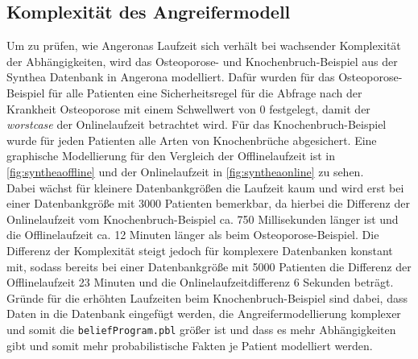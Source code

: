 \documentclass[german,version-2020-11]{uzl-thesis}
\begin{document}
\subsection{Komplexität des Angreifermodell}
Um zu prüfen, wie Angeronas Laufzeit sich verhält bei wachsender Komplexität der Abhängigkeiten, wird das Osteoporose- und Knochenbruch-Beispiel aus der Synthea Datenbank in Angerona modelliert. Dafür wurden für das Osteoporose-Beispiel für alle Patienten eine Sicherheitsregel für die Abfrage nach der Krankheit Osteoporose mit einem Schwellwert von 0 festgelegt, damit der \emph{worstcase} der Onlinelaufzeit betrachtet wird. Für das Knochenbruch-Beispiel wurde für jeden Patienten alle Arten von Knochenbrüche abgesichert. Eine graphische Modellierung für den Vergleich der Offlinelaufzeit ist in \autoref{fig:syntheaoffline} und der Onlinelaufzeit in \autoref{fig:syntheaonline} zu sehen.\\  Dabei wächst für kleinere Datenbankgrößen die Laufzeit kaum und wird erst bei einer Datenbankgröße mit 3000 Patienten bemerkbar, da hierbei die Differenz der Onlinelaufzeit vom Knochenbruch-Beispiel ca. 750 Millisekunden länger ist und die Offlinelaufzeit ca. 12 Minuten länger als beim Osteoporose-Beispiel. Die Differenz der Komplexität steigt jedoch für komplexere Datenbanken konstant mit, sodass bereits bei einer Datenbankgröße mit 5000 Patienten die Differenz der Offlinelaufzeit 23 Minuten und die Onlinelaufzeitdifferenz 6 Sekunden beträgt.
Gründe für die erhöhten Laufzeiten beim Knochenbruch-Beispiel sind dabei, dass Daten in die Datenbank eingefügt werden, die Angreifermodellierung komplexer und somit die \texttt{beliefProgram.pbl} größer ist und dass es mehr Abhängigkeiten gibt und somit mehr probabilistische Fakten je Patient modelliert werden.  
\end{document}
